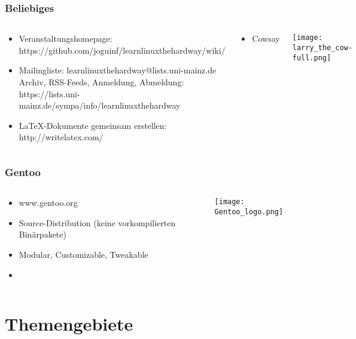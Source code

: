 \documentclass[utf8]{beamer}
\begin{document}
\begin{frame}
\frametitle{Beliebiges}

\begin{columns}
    \begin{block}{}
      \begin{itemize}
      \item Veranstaltungshomepage: https://github.com/joguinf/learnlinuxthehardway/wiki/
      \item Mailingliste: learnlinuxthehardway@lists.uni-mainz.de \\
          Archiv, RSS-Feeds, Anmeldung, Abmeldung: https://lists.uni-mainz.de/sympa/info/learnlinuxthehardway
      \item \LaTeX{}-Dokumente gemeinsam erstellen: http://writelatex.com/
      \end{itemize}
    \end{block}
    \begin{block}{}
      \begin{itemize}
      \item Cowsay
      \end{itemize}
    \end{block}
    \hfill
    \texttt{[image: larry\_the\_cow-full.png]}
\end{columns}
\end{frame}

\begin{frame}
\frametitle{Gentoo}

\begin{columns}
    \begin{block}{}
      \begin{itemize}
      \item www.gentoo.org
      \item Source-Distribution (keine vorkompilierten Binärpakete)
      \item Modular, Customizable, Tweakable
      \item 
      \end{itemize}
    \end{block}
    \hfill
    \texttt{[image: Gentoo\_logo.png]}
\end{columns}

\end{frame}

\section{Themengebiete}
\end{document}
